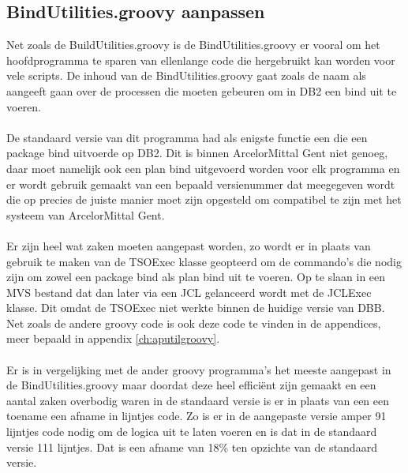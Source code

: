\subsection{BindUtilities.groovy aanpassen}
Net zoals de BuildUtilities.groovy is de BindUtilities.groovy er vooral om het hoofdprogramma te sparen van ellenlange code die hergebruikt kan worden voor vele scripts. De inhoud van de BindUtilities.groovy gaat zoals de naam als aangeeft gaan over de processen die moeten gebeuren om in DB2 een bind uit te voeren. 
\\ \\
De standaard versie van dit programma had als enigste functie een die een package bind uitvoerde op DB2. Dit is binnen ArcelorMittal Gent niet genoeg, daar moet namelijk ook een plan bind uitgevoerd worden voor elk programma en er wordt gebruik gemaakt van een bepaald versienummer dat meegegeven wordt die op precies de juiste manier moet zijn opgesteld om compatibel te zijn met het systeem van ArcelorMittal Gent.
\\ \\
Er zijn heel wat zaken moeten aangepast worden, zo wordt er in plaats van gebruik te maken van de TSOExec klasse geopteerd om de commando's die nodig zijn om zowel een package bind als plan bind uit te voeren. Op te slaan in een MVS bestand dat dan later via een JCL gelanceerd wordt met de JCLExec klasse. Dit omdat de TSOExec niet werkte binnen de huidige versie van DBB. Net zoals de andere groovy code is ook deze code te vinden in de appendices, meer bepaald in appendix \ref{ch:aputilgroovy}. 
\\ \\
Er is in vergelijking met de ander groovy programma's het meeste aangepast in de BindUtilities.groovy maar doordat deze heel efficiënt zijn gemaakt en een aantal zaken overbodig waren in de standaard versie is er in plaats van een een toename een afname in lijntjes code. Zo is er in de aangepaste versie amper 91 lijntjes code nodig om de logica uit te laten voeren en is dat in de standaard versie 111 lijntjes. Dat is een afname van 18\% ten opzichte van de standaard versie. 

